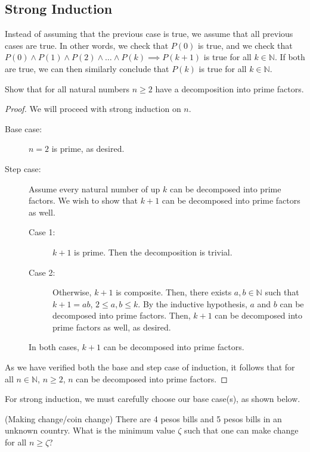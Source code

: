 \subsection{Strong Induction}
Instead of assuming that the previous case is true, we assume that all previous cases are true. In other words, we check that \( P(0) \) is true, and we check that \( P(0) \land P(1) \land P(2) \land \ldots \land P(k) \implies P(k+1) \) is true for all \( k \in \mathbb{N} \). If both are true, we can then similarly conclude that \( P(k) \) is true for all \( k\in \mathbb{N} \).

\begin{eg}
	Show that for all natural numbers \( n\ge 2 \) have a decomposition into prime factors. 
\end{eg}

\begin{proof}
	We will proceed with strong induction on \( n \).
	\begin{description}
		\item[Base case:] \( n=2 \) is prime, as desired.
		\item[Step case:] Assume every natural number of up \( k \) can be decomposed into prime factors. We wish to show that \( k+1 \) can be decomposed into prime factors as well.
			\begin{description}
				\item[Case 1:] \( k+1 \) is prime. Then the decomposition is trivial.
				\item[Case 2:] Otherwise, \( k+1 \) is composite. Then, there exists \( a, b \in \mathbb{N} \) such that \( k+1 = ab \), \( 2\le a,b\le k \). By the inductive hypothesis, \( a \) and \( b \) can be decomposed into prime factors. Then, \( k+1 \) can be decomposed into prime factors as well, as desired.
			\end{description}
			In both cases, \( k+1 \) can be decomposed into prime factors.
	\end{description}
	As we have verified both the base and step case of induction, it follows that for all \( n\in \mathbb{N} \), \( n\ge 2 \), \( n \) can be decomposed into prime factors.
\end{proof}

\begin{note}
	For strong induction, we must carefully choose our base case(s), as shown below.
\end{note}

\begin{eg}
	(Making change/coin change) There are 4 pesos bills and 5 pesos bills in an unknown country. What is the minimum value \( \zeta \) such that one can make change for all \( n \ge \zeta \)?
\end{eg}

